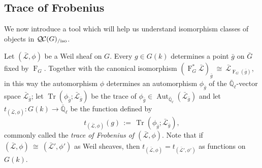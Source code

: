 \documentclass{amsart}
\theoremstyle{plain}
\theoremstyle{definition}
\theoremstyle{remark}
\newcommand{\EE}{\mathbb{\bar Q}_\ell}
\newcommand{\bFq}{\bar{k}}
\newcommand{\Fq}{k}
\newcommand{\Weil}[1]{\mathcal{W}_{#1}}
\DeclareMathOperator{\Gal}{Gal}
\newcommand{\Frob}[1]{\operatorname{F}_{#1}}
\DeclareMathOperator{\Aut}{Aut}
\DeclareMathOperator{\trace}{Tr}
\newcommand{\ceq}{{\, :=\, }}
\newcommand{\iso}{{\ \cong\ }}
\newcommand{\gqcs}[1]{{\mathcal{\bar #1}}}
\newcommand{\QC}{{\mathcal{Q\hskip-0.8pt C}}}
\newcommand{\QCiso}[1]{\QC(#1)_{/\text{iso}}}
\newcommand{\trFrob}[1]{t_{#1}}
\newcommand{\bg}{\bar{g}}
\newcommand{\bG}{\bar{G}}
\begin{document}
\subsection{Trace of Frobenius}\label{sec:Frob}

We now introduce a tool which will help us understand isomorphism classes of objects in $\QCiso{G}$.



%


Let $(\gqcs{L},\phi)$ be a Weil sheaf on $G$. Every $g\in G(\Fq)$
determines a point $\bg$ on $\bG$ fixed by $\Frob{G}$. 
Together with the canonical isomorphism $(\Frob{G}^*\gqcs{L})_{\bg} \iso  \gqcs{L}_{\Frob{G}(\bg)}$, in this way the automorphism $\phi$ determines an automorphism $\phi_{\bg}$ of the $\EE$-vector space $\gqcs{L}_{\bg}$; let $\trace(\phi_{\bg};\gqcs{L}_{\bg})$ be the trace of $\phi_{\bg} \in \Aut_{\EE}(\gqcs{L}_{\bg})$ and let $\trFrob{(\gqcs{L},\phi)} : G(\Fq)\to \EE$ be the function defined by 
\begin{equation}\label{trWeil}
\trFrob{(\gqcs{L},\phi)}(g) \ceq \trace(\phi_{\bg};\gqcs{L}_{\bg}),
\end{equation}
commonly called the {\em trace of Frobenius of $(\gqcs{L},\phi)$}.
Note that if $(\gqcs{L},\phi) \iso (\gqcs{L'},\phi')$ as Weil sheaves, 
then $\trFrob{(\gqcs{L},\phi)} = \trFrob{(\gqcs{L'},\phi')}$ as functions on $G(\Fq)$.
\end{document}
